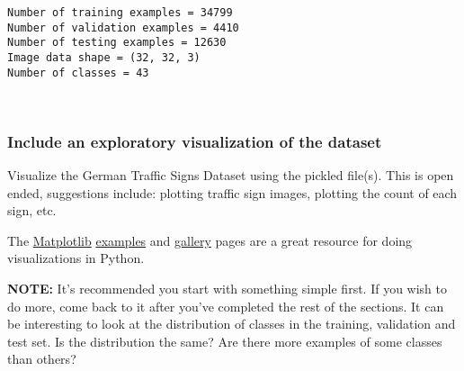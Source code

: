 \documentclass[11pt]{article}
\begin{document}
    \begin{Verbatim}[commandchars=\\\{\}]
Number of training examples = 34799
Number of validation examples = 4410
Number of testing examples = 12630
Image data shape = (32, 32, 3)
Number of classes = 43

    \end{Verbatim}

    \begin{center}
    \end{center}
    { \hspace*{\fill} \\}
    
    \subsubsection{Include an exploratory visualization of the
dataset}\label{include-an-exploratory-visualization-of-the-dataset}

    Visualize the German Traffic Signs Dataset using the pickled file(s).
This is open ended, suggestions include: plotting traffic sign images,
plotting the count of each sign, etc.

The \href{http://matplotlib.org/}{Matplotlib}
\href{http://matplotlib.org/examples/index.html}{examples} and
\href{http://matplotlib.org/gallery.html}{gallery} pages are a great
resource for doing visualizations in Python.

\textbf{NOTE:} It's recommended you start with something simple first.
If you wish to do more, come back to it after you've completed the rest
of the sections. It can be interesting to look at the distribution of
classes in the training, validation and test set. Is the distribution
the same? Are there more examples of some classes than others?
\end{document}
